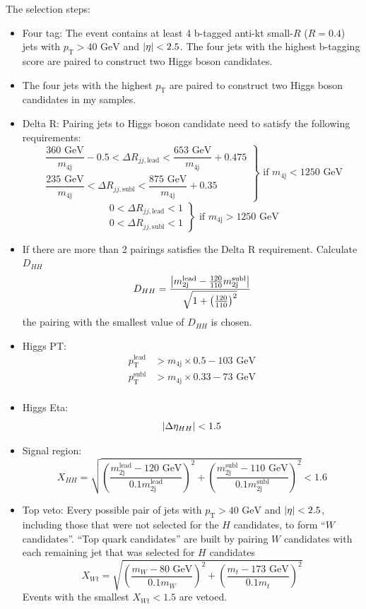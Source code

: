 \documentclass[12pt]{article}
\begin{document}
			The selection steps:
			\begin{itemize}
			\item Four tag: The event contains at least 4 b-tagged anti-kt small-$R$ ($R = 0.4$) jets with $p_\text{T} > \text{40 GeV}$ and $\abs{\eta} < 2.5$. The four jets with the highest b-tagging score are paired to construct two Higgs boson candidates.
			\item The four jets with the highest $p_\text{T}$ are paired to construct two Higgs boson candidates in my samples.
			\item Delta R: Pairing jets to Higgs boson candidate need to satisfy the following requirements:
			\[
				\left.
				\begin{array}{c}
					\dfrac{\text{360 GeV}}{m_\text{4j}} - 0.5 < \Delta R_{jj,\text{lead}} < \dfrac{\text{653 GeV}}{m_{\text{4j}}} + 0.475 \\
					\dfrac{\text{235 GeV}}{m_\text{4j}}  < \Delta R_{jj,\text{subl}} < \dfrac{\text{875 GeV}}{m_{\text{4j}}} + 0.35 
				\end{array} 
				\right\} \text{ if } m_{\text{4j}} <  \text{1250 GeV}
			\] 
			\[
				\left.
				\begin{array}{c}
					0 < \Delta R_{jj,\text{lead}} < 1 \\
					0 < \Delta R_{jj,\text{subl}} < 1 
				\end{array} 
				\right\} \text{ if } m_{\text{4j}} >  \text{1250 GeV}
			\] 
			\item If there are more than 2 pairings satisfies the Delta R requirement. Calculate $D_{HH}$
			\[
				D_{HH} = \frac{\abs{m_{\text{2j}}^{\text{lead}} - \frac{120}{110} m_{\text{2j}}^{\text{subl}}}}{\sqrt{1 + \left( \frac{120}{110} \right)^2}}
			\] 
			the pairing with the smallest value of $D_{HH}$ is chosen.
			\item Higgs PT: 
			\begin{align*}
				p_{\text{T}}^{\text{lead}} &> m_{\text{4j}} \times 0.5 - \text{103 GeV} \\
				p_{\text{T}}^{\text{subl}} &> m_{\text{4j}} \times 0.33 - \text{73 GeV} \\
			\end{align*}
			\item Higgs Eta: 
			\[
				\abs{\Delta\eta_{HH}} < 1.5
			\] 
			\item Signal region:
			\[
				X_{HH} = \sqrt{\left( \frac{m_{\text{2j}}^{\text{lead}} - \text{120 GeV}}{0.1 m_{\text{2j}}^{\text{lead}}} \right)^2 + \left(\frac{m_{\text{2j}}^{\text{subl}} - \text{110 GeV}}{0.1 m_{\text{2j}}^{\text{subl}}} \right)^2} < 1.6
			\]
			\item Top veto: Every possible pair of jets with $p_\text{T} > \text{40 GeV}$ and $\abs{\eta} < 2.5$, including those that were not selected for the $H$ candidates, to form ``$W$ candidates''. ``Top quark candidates'' are built by pairing $W$ candidates with each remaining jet that was selected for $H$ candidates
			\[
				X_{Wt} = \sqrt{\left( \frac{m_{W} - \text{80 GeV}}{0.1 m_{W}} \right)^2 + \left(\frac{m_{t} - \text{173 GeV}}{0.1 m_{t}} \right)^2} 
			\] 
			Events with the smallest $X_{Wt} < 1.5$ are vetoed.

			\end{itemize}
\end{document}
